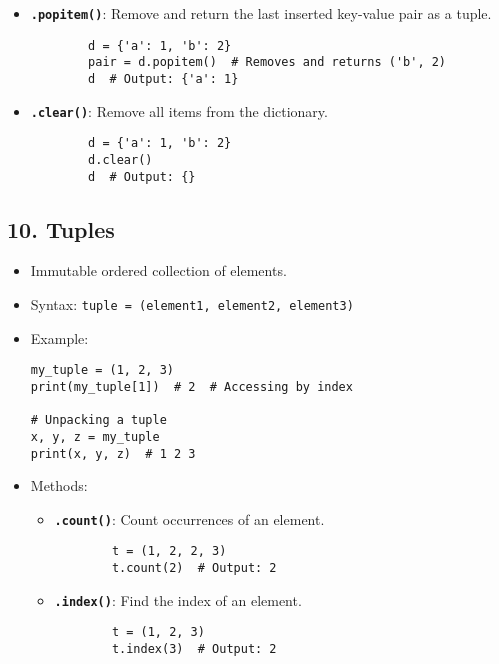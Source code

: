 \begin{itemize}
\begin{itemize}
\begin{verbatim}
        \end{verbatim}
        \item \textbf{\texttt{.popitem()}}: Remove and return the last inserted key-value pair as a tuple.
        \begin{verbatim}
        d = {'a': 1, 'b': 2}
        pair = d.popitem()  # Removes and returns ('b', 2)
        d  # Output: {'a': 1}
        \end{verbatim}
        \item \textbf{\texttt{.clear()}}: Remove all items from the dictionary.
        \begin{verbatim}
        d = {'a': 1, 'b': 2}
        d.clear()
        d  # Output: {}
        \end{verbatim}
    \end{itemize}
\end{itemize}

\subsection*{10. Tuples}
\begin{itemize}
    \item Immutable ordered collection of elements.
    \item Syntax: \texttt{tuple = (element1, element2, element3)}
    \item Example:
    \begin{verbatim}
my_tuple = (1, 2, 3)
print(my_tuple[1])  # 2  # Accessing by index

# Unpacking a tuple
x, y, z = my_tuple
print(x, y, z)  # 1 2 3
    \end{verbatim}
    \item Methods:
    \begin{itemize}
        \item \textbf{\texttt{.count()}}: Count occurrences of an element.
        \begin{verbatim}
        t = (1, 2, 2, 3)
        t.count(2)  # Output: 2
        \end{verbatim}
        \item \textbf{\texttt{.index()}}: Find the index of an element.
        \begin{verbatim}
        t = (1, 2, 3)
        t.index(3)  # Output: 2
        \end{verbatim}
    \end{itemize}
\end{itemize}

